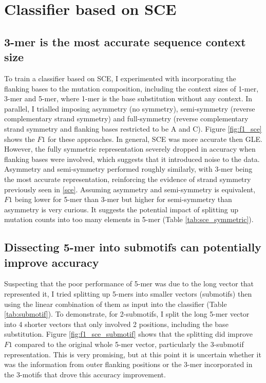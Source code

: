 

\section{Classifier based on SCE}\label{ml:sce}

\subsection{3-mer is the most accurate sequence context size}
To train a classifier based on SCE, I experimented with incorporating the flanking bases to the mutation composition, including the context sizes of 1-mer, 3-mer and 5-mer, where 1-mer is the base substitution without any context. In parallel, I trialled imposing asymmetry (no symmetry), semi-symmetry (reverse complementary strand symmetry) and full-symmetry (reverse complementary strand symmetry and flanking bases restricted to be A and C). Figure \ref{fig:f1_sce} shows the $F1$ for these approaches. In general, SCE was more accurate then GLE. However, the fully symmetric representation severely dropped in accuracy when flanking bases were involved, which suggests that it introduced noise to the data. Asymmetry and semi-symmetry performed roughly similarly, with 3-mer being the most accurate representation, reinforcing the evidence of strand symmetry previously seen in \ref{sce}. Assuming asymmetry and semi-symmetry is equivalent, $F1$ being lower for 5-mer than 3-mer but higher for semi-symmetry than asymmetry is very curious. It suggests the potential impact of splitting up mutation counts into too many elements in 5-mer (Table \ref{tab:sce_symmetric}).



\subsection{Dissecting 5-mer into submotifs can potentially improve accuracy}
Suspecting that the poor performance of 5-mer was due to the long vector that represented it, I tried splitting up 5-mers into smaller vectors (submotifs) then using the linear combination of them as input into the classifier (Table \ref{tab:submotif}). To demonstrate, for 2-submotifs, I split the long 5-mer vector into 4 shorter vectors that only involved 2 positions, including the base substitution. Figure \ref{fig:f1_sce_submotif} shows that the splitting did improve $F1$ compared to the original whole 5-mer vector, particularly the 3-submotif representation. This is very promising, but at this point it is uncertain whether it was the information from outer flanking positions or the 3-mer incorporated in the 3-motifs that drove this accuracy improvement.

